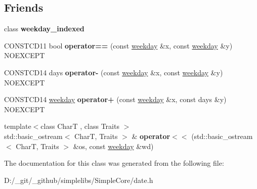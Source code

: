 \subsection*{Friends}
\begin{DoxyCompactItemize}
\item 
\mbox{\label{classdate_1_1weekday_af367d6fede344b2b74e78ce59b3127c1}} 
class {\bfseries weekday\+\_\+indexed}
\item 
\mbox{\label{classdate_1_1weekday_ad1c8b2fc24ad6ef001ea088041f451ce}} 
C\+O\+N\+S\+T\+C\+D11 bool {\bfseries operator==} (const \mbox{\hyperlink{classdate_1_1weekday}{weekday}} \&x, const \mbox{\hyperlink{classdate_1_1weekday}{weekday}} \&y) N\+O\+E\+X\+C\+E\+PT
\item 
\mbox{\label{classdate_1_1weekday_a28ef0290c09f215b68b153455d924ab9}} 
C\+O\+N\+S\+T\+C\+D14 days {\bfseries operator-\/} (const \mbox{\hyperlink{classdate_1_1weekday}{weekday}} \&x, const \mbox{\hyperlink{classdate_1_1weekday}{weekday}} \&y) N\+O\+E\+X\+C\+E\+PT
\item 
\mbox{\label{classdate_1_1weekday_a5ad795d849ee56bdaaa349fa4f4cd797}} 
C\+O\+N\+S\+T\+C\+D14 \mbox{\hyperlink{classdate_1_1weekday}{weekday}} {\bfseries operator+} (const \mbox{\hyperlink{classdate_1_1weekday}{weekday}} \&x, const days \&y) N\+O\+E\+X\+C\+E\+PT
\item 
\mbox{\label{classdate_1_1weekday_a76c5b6365caeb255d01e998dc41c4c60}} 
{\footnotesize template$<$class CharT , class Traits $>$ }\\std\+::basic\+\_\+ostream$<$ CharT, Traits $>$ \& {\bfseries operator$<$$<$} (std\+::basic\+\_\+ostream$<$ CharT, Traits $>$ \&os, const \mbox{\hyperlink{classdate_1_1weekday}{weekday}} \&wd)
\end{DoxyCompactItemize}


The documentation for this class was generated from the following file\+:\begin{DoxyCompactItemize}
\item 
D\+:/\+\_\+git/\+\_\+github/simplelibs/\+Simple\+Core/date.\+h\end{DoxyCompactItemize}
